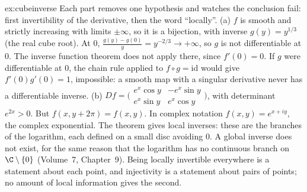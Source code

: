 \begin{solution}{ex:cubeinverse}
\idea Each part removes one hypothesis and watches the conclusion fail: first invertibility of the derivative, then the word ``locally''.
\writeup (a) $f$ is smooth and strictly increasing with limits $\pm\infty$, so it is a bijection, with inverse $g(y)=y^{1/3}$ (the real cube root). At $0$,
$\frac{g(y)-g(0)}y=y^{-2/3}\to+\infty$, so $g$ is not differentiable at $0$. The inverse function theorem does not apply there, since $f'(0)=0$. If $g$ were
differentiable at $0$, the chain rule applied to $f\circ g=\mathrm{id}$ would give $f'(0)g'(0)=1$, impossible: a smooth map with a singular derivative
never has a differentiable inverse. (b) $Df=\bigl(\begin{smallmatrix}e^x\cos y&-e^x\sin y\\ e^x\sin y&e^x\cos y\end{smallmatrix}\bigr)$, with determinant
$e^{2x}>0$. But $f(x,y+2\pi)=f(x,y)$. In complex notation $f(x,y)=e^{x+iy}$, the complex exponential. The theorem gives local inverses: these are the
branches of the logarithm, each defined on a small disc avoiding $0$. A global inverse does not exist, for the same reason that the logarithm has no
continuous branch on $\C\setminus\{0\}$ (Volume~7, Chapter~9). Being locally invertible everywhere is a statement about each point, and injectivity is a
statement about pairs of points; no amount of local information gives the second.
\end{solution}

